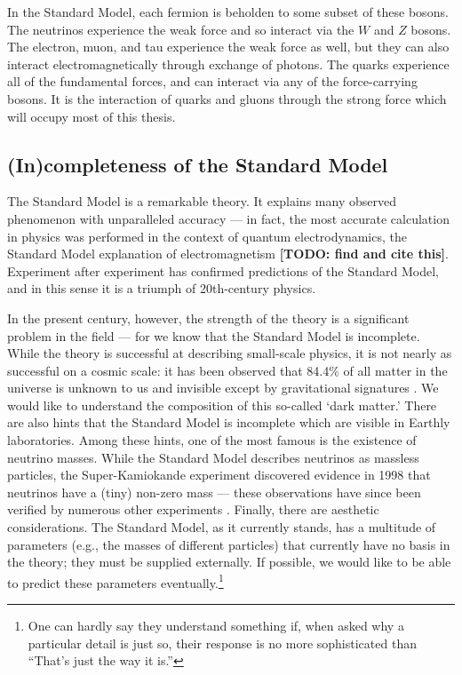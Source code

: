 \documentclass[../thesis.tex]{subfiles}
\begin{document}
	In the Standard Model, each fermion is beholden to some subset of these bosons. The neutrinos experience the weak force and so interact via the $W$ and $Z$ bosons. The electron, muon, and tau experience the weak force as well, but they can also interact electromagnetically through exchange of photons. The quarks experience all of the fundamental forces, and can interact via any of the force-carrying bosons. It is the interaction of quarks and gluons through the strong force which will occupy most of this thesis.


\subsection{(In)completeness of the Standard Model}
	The Standard Model is a remarkable theory. It explains many observed phenomenon with unparalleled accuracy --- in fact, the most accurate calculation in physics was performed in the context of quantum electrodynamics, the Standard Model explanation of electromagnetism \cite{larkoski_elementary_2019-1} {\color{red}\textbf{[TODO: find and cite this]}}. Experiment after experiment has confirmed predictions of the Standard Model, and in this sense it is a triumph of 20th-century physics.

	In the present century, however, the strength of the theory is a significant problem in the field --- for we know that the Standard Model is incomplete. While the theory is successful at describing small-scale physics, it is not nearly as successful on a cosmic scale: it has been observed that 84.4\% of all matter in the universe is unknown to us and invisible except by gravitational signatures \cite{particle_data_group_review_2020}. We would like to understand the composition of this so-called `dark matter.' There are also hints that the Standard Model is incomplete which are visible in Earthly laboratories. Among these hints, one of the most famous is the existence of neutrino masses. While the Standard Model describes neutrinos as massless particles, the Super-Kamiokande experiment discovered evidence in 1998 that neutrinos have a (tiny) non-zero mass \cite{super-kamiokande_collaboration_evidence_1998} --- these observations have since been verified by numerous other experiments \cite{particle_data_group_review_2020}. Finally, there are aesthetic considerations. The Standard Model, as it currently stands, has a multitude of parameters (e.g., the masses of different particles) that currently have no basis in the theory; they must be supplied externally. If possible, we would like to be able to predict these parameters eventually.\footnote{One can hardly say they understand something if, when asked why a particular detail is just so, their response is no more sophisticated than ``That's just the way it is.''}
\end{document}
